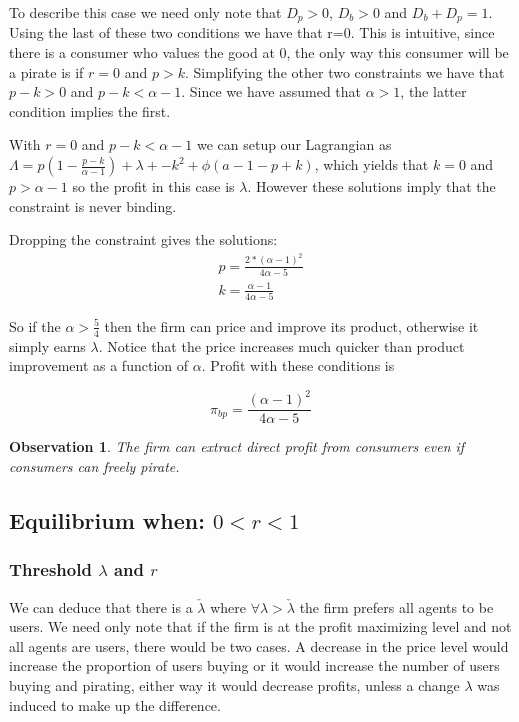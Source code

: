 \documentclass{article}
\newtheorem{observation}{Observation}
\begin{document}
To describe this case we need only note that $D_p > 0$, $D_b>0$ and $D_b+D_p=1$. Using the last of these two conditions we have that r=0. This is intuitive, since there is a consumer who values the good at 0, the only way this consumer will be a pirate is if $r=0$ and $p>k$.  Simplifying the other two constraints we have that $p-k>0$ and $p-k<\alpha-1$. Since we have assumed that $\alpha >1$, the latter condition implies the first. 

With $r=0$ and $p-k<\alpha-1$ we can setup our Lagrangian as $\Lambda = p(1-\frac{p-k}{\alpha-1}) + \lambda + -k^2 +\phi(a-1-p+k)$, which yields that $k=0$ and $p>\alpha-1$ so the profit in this case is $\lambda$. However these solutions imply that the constraint is never binding. 

Dropping the constraint gives the solutions: 
\begin{equation}
\begin{array}{ll}
p = \frac{2*(\alpha-1)^{2}}{4\alpha-5} \\
k = \frac{\alpha-1}{4\alpha-5}
\end{array}
\end{equation}

So if the $\alpha>\frac{5}{4}$ then the firm can price and improve its product, otherwise it simply earns $\lambda$. Notice that the price increases much quicker than product improvement as a function of $\alpha$. Profit with these conditions is 

\begin{equation}
\pi_{bp} = \frac{ (\alpha -1)^2}{4 \alpha -5}
\end{equation} 

\begin{observation}
The firm can extract direct profit from consumers even if consumers can freely pirate. 
\end{observation}



\subsection{Equilibrium when: $0<r<1$}

\subsubsection{Threshold $\lambda$ and $r$ }

We can deduce that there is a $\check{\lambda}$ where $\forall \lambda>\check{\lambda}$ the firm prefers all agents to be users. We need only note that if the firm is at the profit maximizing level and not all agents are users, there would be two cases. A decrease in the price level would increase the proportion of users buying or it would increase the number of users buying and pirating, either way it would decrease profits, unless a change $\lambda$  was induced to make up the difference. 
\end{document}
